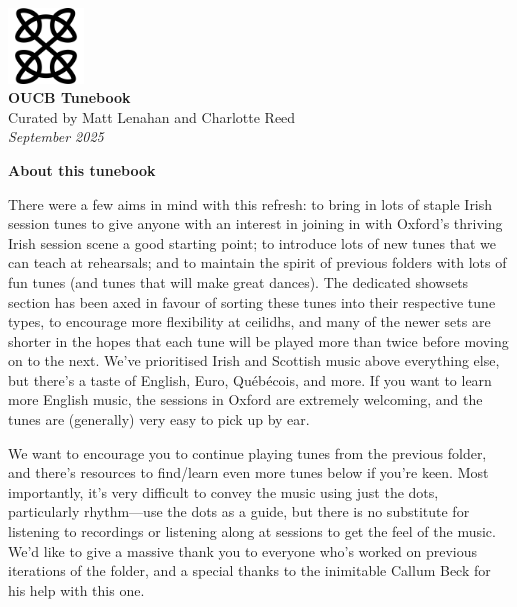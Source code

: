 \documentclass[11pt]{article}
\begin{document}

\vspace*{10\baselineskip}
\begin{center}
    \includegraphics[width=2cm]{oucb-800px.png}\\
    \vspace{4\baselineskip}
    {\Huge\textbf{OUCB Tunebook}}\\
    \vspace{4\baselineskip}
    Curated by Matt Lenahan and Charlotte Reed\\
    \textit{September 2025}
\end{center}
\clearpage


\centerline{\Large\textbf{About this tunebook}}

There were a few aims in mind with this refresh: to bring in lots of staple Irish session tunes to give anyone with an interest in joining in with Oxford's thriving Irish session scene a good starting point; to introduce lots of new tunes that we can teach at rehearsals; and to maintain the spirit of previous folders with lots of fun tunes (and tunes that will make great dances). The dedicated showsets section has been axed in favour of sorting these tunes into their respective tune types, to encourage more flexibility at ceilidhs, and many of the newer sets are shorter in the hopes that each tune will be played more than twice before moving on to the next. We've prioritised Irish and Scottish music above everything else, but there's a taste of English, Euro, Qu\'eb\'ecois, and more. If you want to learn more English music, the sessions in Oxford are extremely welcoming, and the tunes are (generally) very easy to pick up by ear.

We want to encourage you to continue playing tunes from the previous folder, and there's resources to find/learn even more tunes below if you're keen. Most importantly, it's very difficult to convey the music using just the dots, particularly rhythm---use the dots as a guide, but there is no substitute for listening to recordings or listening along at sessions to get the feel of the music. We'd like to give a massive thank you to everyone who's worked on previous iterations of the folder, and a special thanks to the inimitable Callum Beck for his help with this one.
\end{document}
